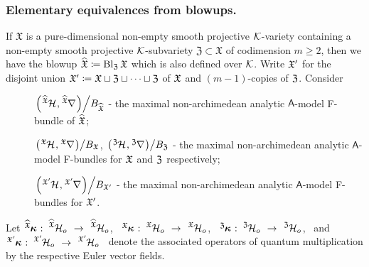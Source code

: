 \documentclass[twoside,leqno]{article}
\numberwithin{equation}{section}
\theoremstyle{plain}
\theoremstyle{definition}
\begin{document}
\subsubsection{Elementary equivalences from blowups.} \label{sssec:eqblowupGatoms}
If $\mathfrak{X}$ is a pure-dimensional non-empty smooth projective $\mathcal K$-variety containing a  non-empty smooth projective $\mathcal K$-subvariety $\mathfrak{Z}\subset \mathfrak{X}$ of codimension $m\ge 2$, then we have the blowup $\widehat{\mathfrak{X}} \coloneqq \operatorname{Bl}_{\mathfrak{Z}} \mathfrak{X}$ which is also defined over $\mathcal K$. Write $\mathfrak X'$
for the disjoint union $\mathfrak X' \coloneqq \mathfrak X \sqcup \mathfrak Z \sqcup \cdots \sqcup \mathfrak Z$ of $\mathfrak X$ and $(m-1)$-copies of $\mathfrak Z$. Consider 

\medskip 

\begin{description}
\item[] {$\left.\left(\tensor[^{\widehat{\fX}}]{\cH}{},\tensor[^{\widehat{\fX}}]{\nabla}{}\right)\right/\!B_{\widehat{\fX}}$} - the maximal non-archimedean analytic $\mathsf{A}$-model  F-bundle of $\widehat{\mathfrak X}$;
    \item[] {$\left.\left(\tensor[^{\fX}]{\cH}{},\tensor[^{\fX}]{\nabla}{}\right)\right/\!  B_{\fX}$, $\left.\left(\tensor[^{\fZ}]{\cH}{},\tensor[^{\fZ}]{\nabla}{}\right)\right/\!B_{\fZ}$} - the maximal non-archimedean analytic $\mathsf{A}$-model  F-bundles for $\mathfrak X$ and $\mathfrak Z$ respectively; 
    \item[] {$\left.\left(\tensor[^{\fX'}]{\cH}{},\tensor[^{\fX'}]{\nabla}{}\right)\right/\! B_{\fX'}$}  - the maximal non-archimedean analytic $\mathsf{A}$-model  F-bundles for $\mathfrak X'$.
\end{description}

\medskip


Let  
$\tensor[^{\widehat{\fX}}]{\bkappa}{} \, \colon \, \tensor[^{\widehat{\fX}}]{{\cH_{o}}}{} \ \to \ 
\tensor[^{\widehat{\fX}}]{{\cH_{o}}}{}$, \ 
$\tensor[^{\fX}]{\bkappa}{} \, \colon \, \tensor[^{\fX}]{{\cH_{o}}}{} \ \to \ 
\tensor[^{\fX}]{{\cH_{o}}}{}$, \ 
$\tensor[^{\fZ}]{\bkappa}{} \, \colon \, \tensor[^{\fZ}]{{\cH_{o}}}{} \ \to \ 
\tensor[^{\fZ}]{{\cH_{o}}}{}$, \ and  
$\tensor[^{\fX'}]{\bkappa}{} \, \colon \, \tensor[^{\fX'}]{{\cH_{o}}}{} \ \to \ 
\tensor[^{\fX'}]{{\cH_{o}}}{}$
\ denote the associated operators of quantum multiplication by the respective Euler vector fields. 


\medskip 
\end{document}

